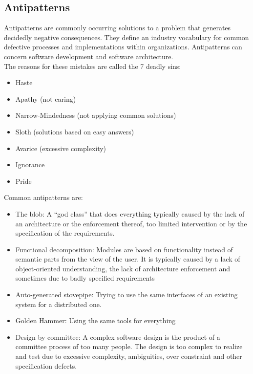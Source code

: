 \subsection{Antipatterns}
Antipatterns are commonly occurring solutions to a problem that generates decidedly negative consequences.
They define an industry vocabulary for common defective processes and implementations within organizations.
Antipatterns can concern software development and software architecture.\\
The reasons for these mistakes are called the 7 deadly sins:
\begin{itemize}
  \item Haste
  \item Apathy (not caring)
  \item Narrow-Mindedness (not applying common solutions)
  \item Sloth (solutions based on easy answers)
  \item Avarice (excessive complexity)
  \item Ignorance
  \item Pride
\end{itemize}

Common antipatterns are:
\begin{itemize}
  \item The blob: A ``god class'' that does everything typically caused by the lack of an architecture or the enforcement thereof, too limited intervention or by the specification of the requirements. 
  \item Functional decomposition: Modules are based on functionality instead of semantic parts from the view of the user. It is typically caused by a lack of object-oriented understanding, the lack of architecture enforcement and sometimes due to badly specified requirements
  \item Auto-generated stovepipe: Trying to use the same interfaces of an existing system for a distributed one.
  \item Golden Hammer: Using the same tools for everything
  \item Design by committee: A complex software design is the product of a committee process of too many people. The design is too complex to realize and test due to excessive complexity, ambiguities, over constraint and other specification defects.
\end{itemize}

